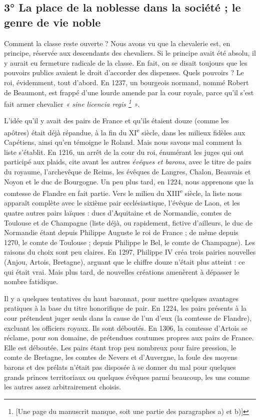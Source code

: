 \documentclass[french,twoside]{book} %
\newcommand{\labelchar}[1]{{\color{rubric}\bf #1}}
\begin{document}
\subsection[3° La place de la noblesse dans la société ; le genre de vie noble]{3° La place de la noblesse dans la société ; le genre de vie noble}
\noindent \labelchar{a)} Comment la classe reste ouverte ? Nous avons vu que la chevalerie est, en principe, réservée aux descendants des chevaliers. Si le principe avait été absolu, il y aurait eu fermeture radicale de la classe. En fait, on se disait toujours que les pouvoirs publics avaient le droit d’accorder des dispenses. Quels pouvoirs ? Le roi, évidemment, tout d’abord. En 1237, un bourgeois normand, nommé Robert de Beaumont, est frappé d’une lourde amende par la cour royale, parce qu’il s’est fait armer chevalier \emph{« sine licencia regis \footnote{[Une page du manuscrit manque, soit une partie des paragraphes a) et b)]} »}.\par
[…]\par
\label{p68} L’idée qu’il y avait des pairs de France et qu’ils étaient douze (comme les apôtres) était déjà répandue, à la fin du XI\textsuperscript{e} siècle, dans les milieux fidèles aux Capétiens, ainsi qu’en témoigne le Roland. Mais nous savons mal comment la liste s’établit. En 1216, un arrêt de la cour du roi, énumérant les juges qui ont participé aux plaids, cite avant les autres \emph{évêques et barons}, avec le titre de pairs du royaume, l’archevêque de Reims, les évêques de Langres, Chalon, Beauvais et Noyon et le duc de Bourgogne. Un peu plus tard, en 1224, nous apprenons que la comtesse de Flandre en fait partie. Vers le milieu du XIII\textsuperscript{e} siècle, la liste nous apparaît complète avec le sixième pair ecclésiastique, l’évêque de Laon, et les quatre autres pairs laïques : ducs d’Aquitaine et de Normandie, comtes de Toulouse et de Champagne (liste déjà, ou rapidement, fictive d’ailleurs, le duc de Normandie étant depuis Philippe Auguste le roi de France ; de même depuis 1270, le comte de Toulouse ; depuis Philippe le Bel, le comte de Champagne). Les raisons du choix sont peu claires. En 1297, Philippe IV créa trois pairies nouvelles (Anjou, Artois, Bretagne), arguant que le chiffre douze n’était plus atteint : ce qui était vrai. Mais plus tard, de nouvelles créations amenèrent à dépasser le nombre fatidique.\par
Il y a quelques tentatives du haut baronnat, pour mettre quelques avantages pratiques à la base du titre honorifique de pair. En 1224, les pairs présents à la cour prétendent juger seuls dans la cause de l’un d’eux (la comtesse de Flandre), excluant les officiers royaux. Ils sont déboutés. En 1306, la comtesse d’Artois se réclame, pour son domaine, de prétendues coutumes propres aux pairs de France. Elle est déboutée. Les pairs étant trop peu nombreux pour faire pression, le comte de Bretagne, les comtes de Nevers et d’Auvergne, la foule des moyens barons et des prélats n’était pas disposée à se donner du mal pour quelques grands princes territoriaux ou quelques évêques parmi beaucoup, les uns comme les autres assez arbitrairement choisis.\par
\end{document}
